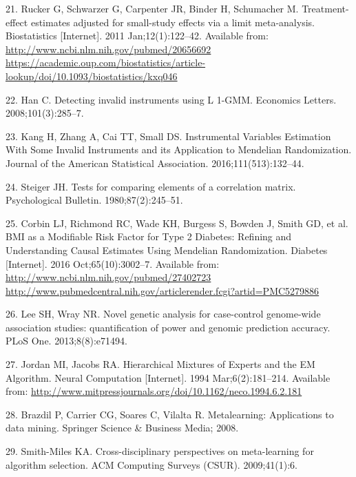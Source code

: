 \documentclass[]{article}
\begin{document}
\hypertarget{ref-Rucker2011}{}
21. Rucker G, Schwarzer G, Carpenter JR, Binder H, Schumacher M.
Treatment-effect estimates adjusted for small-study effects via a limit
meta-analysis. Biostatistics {[}Internet{]}. 2011 Jan;12(1):122--42.
Available from:
\href{http://www.ncbi.nlm.nih.gov/pubmed/20656692\%20https://academic.oup.com/biostatistics/article-lookup/doi/10.1093/biostatistics/kxq046}{http://www.ncbi.nlm.nih.gov/pubmed/20656692 https://academic.oup.com/biostatistics/article-lookup/doi/10.1093/biostatistics/kxq046}

\hypertarget{ref-Han2008}{}
22. Han C. Detecting invalid instruments using L 1-GMM. Economics
Letters. 2008;101(3):285--7.

\hypertarget{ref-Kang2016}{}
23. Kang H, Zhang A, Cai TT, Small DS. Instrumental Variables Estimation
With Some Invalid Instruments and its Application to Mendelian
Randomization. Journal of the American Statistical Association.
2016;111(513):132--44.

\hypertarget{ref-Steiger1980}{}
24. Steiger JH. Tests for comparing elements of a correlation matrix.
Psychological Bulletin. 1980;87(2):245--51.

\hypertarget{ref-Corbin2016}{}
25. Corbin LJ, Richmond RC, Wade KH, Burgess S, Bowden J, Smith GD, et
al. BMI as a Modifiable Risk Factor for Type 2 Diabetes: Refining and
Understanding Causal Estimates Using Mendelian Randomization. Diabetes
{[}Internet{]}. 2016 Oct;65(10):3002--7. Available from:
\href{http://www.ncbi.nlm.nih.gov/pubmed/27402723\%20http://www.pubmedcentral.nih.gov/articlerender.fcgi?artid=PMC5279886}{http://www.ncbi.nlm.nih.gov/pubmed/27402723 http://www.pubmedcentral.nih.gov/articlerender.fcgi?artid=PMC5279886}

\hypertarget{ref-Lee2013c}{}
26. Lee SH, Wray NR. Novel genetic analysis for case-control genome-wide
association studies: quantification of power and genomic prediction
accuracy. PLoS One. 2013;8(8):e71494.

\hypertarget{ref-Jordan1994}{}
27. Jordan MI, Jacobs RA. Hierarchical Mixtures of Experts and the EM
Algorithm. Neural Computation {[}Internet{]}. 1994 Mar;6(2):181--214.
Available from:
\url{http://www.mitpressjournals.org/doi/10.1162/neco.1994.6.2.181}

\hypertarget{ref-brazdil2008metalearning}{}
28. Brazdil P, Carrier CG, Soares C, Vilalta R. Metalearning:
Applications to data mining. Springer Science \& Business Media; 2008.

\hypertarget{ref-smith2009cross}{}
29. Smith-Miles KA. Cross-disciplinary perspectives on meta-learning for
algorithm selection. ACM Computing Surveys (CSUR). 2009;41(1):6.
\end{document}
